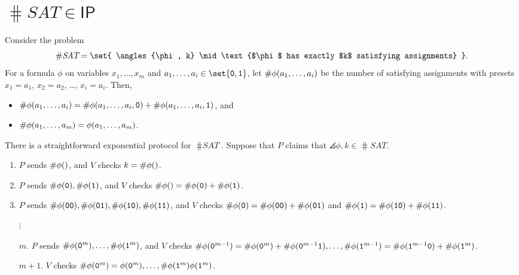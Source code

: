 \documentclass{standalone}
\begin{document}
\section{\texorpdfstring{\(\hash\textit{SAT} \in \mathsf{IP}\)}{\#SAT in IP}}
Consider the problem
\[
  \textsf\#\textit{SAT} = \set{
    \angles{\phi, k} \mid \text{$\phi$ has exactly $k$ satisfying assignments}
  }.
\]
For a formula \(\phi\) on variables \(x_1, \dots, x_m\) and
\(a_1, \dots, a_i \in \set{\mathtt 0, \mathtt 1}\),
let \(\textsf\#\phi(a_1, \dots, a_i)\) be the number of satisfying assignments
with presets \(x_1 = a_1\), \(x_2 = a_2\), \ldots, \(x_i = a_i\).
Then,
\begin{itemize}
  \item \(\textsf\#\phi(a_1, \dots, a_i) = \textsf\#\phi(a_1, \dots, a_i, \mathtt 0) +
                                     \textsf\#\phi(a_1, \dots, a_i, \mathtt 1)\), and
  \item \(\textsf\#\phi(a_1, \dots, a_m) = \phi(a_1, \dots, a_m)\).
\end{itemize}

There is a straightforward exponential protocol for \(\hash\textit{SAT}\).
Suppose that \(P\) claims that \(\angles{\phi, k} \in \hash\textit{SAT}\).
\begin{enumerate}[start=0]
  \item \(P\) sends \(\textsf\#\phi()\), and \(V\) checks \(k = \textsf\#\phi()\).
  \item \(P\) sends \(\textsf\#\phi(\mathtt 0), \textsf\#\phi(\mathtt 1)\),
    and \(V\) checks \(\textsf\#\phi() = \textsf\#\phi(\mathtt 0) + \textsf\#\phi(\mathtt 1)\).
  \item \(P\) sends \(\textsf\#\phi(\mathtt{00}),
                      \textsf\#\phi(\mathtt{01}),
                      \textsf\#\phi(\mathtt{10}),
                      \textsf\#\phi(\mathtt{11})\),
    and \(V\) checks \(\textsf\#\phi(\mathtt 0) = \textsf\#\phi(\mathtt{00}) +
                                            \textsf\#\phi(\mathtt{01})\)
                 and \(\textsf\#\phi(\mathtt 1) = \textsf\#\phi(\mathtt{10}) +
                                            \textsf\#\phi(\mathtt{11})\).
  \item[\(\vdots\)]
  \item[\(m\).] \(P\) sends \(\textsf\#\phi(\mathtt{0}^m), \dots,
                              \textsf\#\phi(\mathtt 1^m)\), and \(V\) checks
    \(\textsf\#\phi(\mathtt 0^{m - 1}) = \textsf\#\phi(\mathtt 0^m) +
                                   \textsf\#\phi(\mathtt 0^{m - 1} \mathtt 1), \dots,
      \textsf\#\phi(\mathtt 1^{m - 1}) = \textsf\#\phi(\mathtt 1^{m - 1} \mathtt 0) +
                                   \textsf\#\phi(\mathtt 1^m)\).
  \item[\(m + 1\).] \(V\) checks \(\textsf\#\phi(\mathtt 0^m) = \phi(\mathtt 0^m),
                            \dots, \textsf\#\phi(\mathtt 1^m) \phi(\mathtt 1^m)\).
\end{enumerate}
\end{document}
